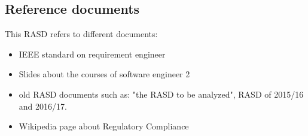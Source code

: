 \subsection{Reference documents}
This RASD refers to different documents:
\begin{itemize}
\item IEEE standard on requirement engineer
\item Slides about the courses of software engineer 2
\item old RASD documents such as: "the RASD to be analyzed", RASD of 2015/16 and 2016/17.
\item Wikipedia page about Regulatory Compliance
\end{itemize}